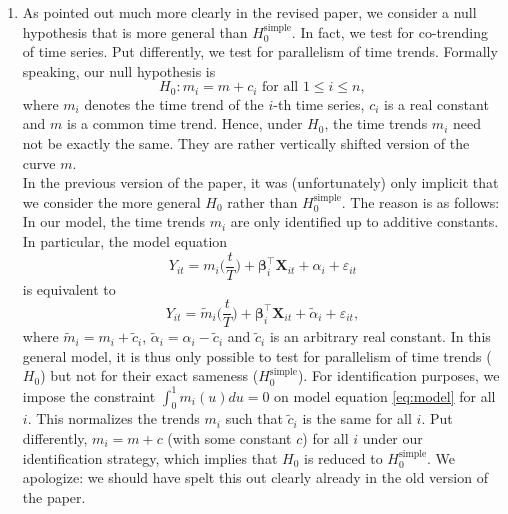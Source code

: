 \documentclass[a4paper,12pt]{article}
\begin{document}
\begin{enumerate}[label=\arabic*.,leftmargin=0.6cm]
\begin{enumerate}[leftmargin=0.7cm]
\item As pointed out much more clearly in the revised paper, we consider a null hypothesis that is more general than $H_0^{\text{simple}}$. In fact, we test for co-trending of time series.  Put differently, we test for parallelism of time trends. Formally speaking, our null hypothesis is
\[ H_0: m_i = m + c_i \text{ for all } 1 \le i \le n, \]
where $m_i$ denotes the time trend of the $i$-th time series, $c_i$ is a real constant and $m$ is a common time trend. Hence, under $H_0$, the time trends $m_i$ need not be exactly the same. They are rather vertically shifted version of the curve $m$. \\
In the previous version of the paper, it was (unfortunately) only implicit that we consider the more general $H_0$ rather than $H_0^{\text{simple}}$. The reason is as follows: In our model, the time trends $m_i$ are only identified up to additive constants. In particular, the model equation 
\begin{equation}\label{eq:model}
Y_{it} = m_i\Big(\frac{t}{T}\Big) + \boldsymbol{\beta}_i^\top \boldsymbol{X}_{it} + \alpha_i + \varepsilon_{it} \tag{$*$}
\end{equation}  
is equivalent to
\[ Y_{it} = \tilde{m}_i\Big(\frac{t}{T}\Big) + \boldsymbol{\beta}_i^\top \boldsymbol{X}_{it} + \tilde{\alpha}_i + \varepsilon_{it}, \]
where $\tilde{m}_i = m_i + \tilde{c}_i$, $\tilde{\alpha}_i = \alpha_i - \tilde{c}_i$ and $\tilde{c}_i$ is an arbitrary real constant. In this general model, it is thus only possible to test for parallelism of time trends ($H_0$) but not for their exact sameness ($H_0^{\text{simple}}$). For identification purposes, we impose the constraint $\int_0^1 m_i(u) du = 0$ on model equation \eqref{eq:model} for all $i$. This normalizes the trends $m_i$ such that $\tilde{c}_i$ is the same for all $i$. Put differently, $m_i = m + c$ (with some constant $c$) for all $i$ under our identification strategy, which implies that $H_0$ is reduced to $H_0^{\text{simple}}$. We apologize: we should have spelt this out clearly already in the old version of the paper. 


\end{enumerate}
\end{enumerate}
\end{document}
